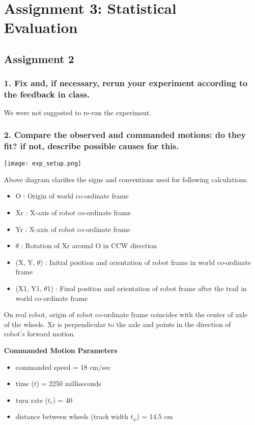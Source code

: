 \section*{Assignment 3: Statistical Evaluation}
\subsection*{Assignment 2}
\subsubsection*{1. Fix and, if necessary, rerun your experiment according to the feedback in class.}
We were not suggested to re-run the experiment.

\subsubsection*{2. Compare the observed and commanded motions: do they fit? if not, describe possible causes for this.} 

\texttt{[image: exp\_setup.png]}

Above diagram clarifies the signs and conventions used for following calculations. 
\begin{itemize}
	\item O : Origin of world co-ordinate frame
	\item Xr : X-axis of robot co-ordinate frame 
	\item Yr : X-axis of robot co-ordinate frame
	\item $\theta$ : Rotation of Xr around O in CCW direction
	\item (X, Y, $\theta$) :  Initial position and orientation of robot frame in world co-ordinate frame
	\item (X1, Y1, $\theta$1) : Final position and orientation of robot frame after the trail in world co-ordinate frame
\end{itemize}

On real robot, origin of robot co-ordinate frame coincides with the center of axle of the wheels. Xr is perpendicular to the axle and points in the direction of robot's forward motion. \newline

	
\textbf{Commanded Motion Parameters}
\begin{itemize}
	\item commanded speed = 18 cm/sec
	\item time ($t$) = 2250 milliseconds
	\item turn rate ($t_r$) = 40 
	\item distance between wheels (track width $t_w$) = 14.5 cm 
\end{itemize}



